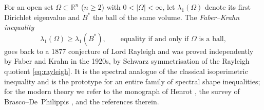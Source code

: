 \documentclass[11pt]{amsart}
\theoremstyle{definition}
\newcommand{\R}{\mathbb R}
\newcommand{\Om}{\Omega}
\newcommand{\Bstar}{B^*}
\begin{document}
For an open set \(\Om\subset\R^n\) (\(n\ge2\)) with \(0<|\Om|<\infty\), let
\(\lambda_1(\Om)\) denote its first Dirichlet eigenvalue and \(\Bstar\) the
ball of the same volume.  The \emph{Faber--Krahn inequality}
\begin{equation}\label{eq:FK-classical}
   \lambda_1(\Om)\ge\lambda_1(\Bstar),\qquad
   \text{equality if and only if \(\Om\) is a ball},
\end{equation}
goes back to a 1877 conjecture of Lord Rayleigh \cite{Rayleigh1877} and was
proved independently by Faber \cite{Faber1923} and Krahn \cite{Krahn1925} in
the 1920s, by Schwarz symmetrisation of the Rayleigh quotient
\eqref{eq:rayleigh}.  It is the spectral analogue of the classical
isoperimetric inequality and is the prototype for an entire family of
spectral shape inequalities; for the modern theory we refer to the
monograph of Henrot \cite{Henrot2006}, the survey of Brasco--De~Philippis
\cite{BraDeP2017}, and the references therein.
\end{document}
